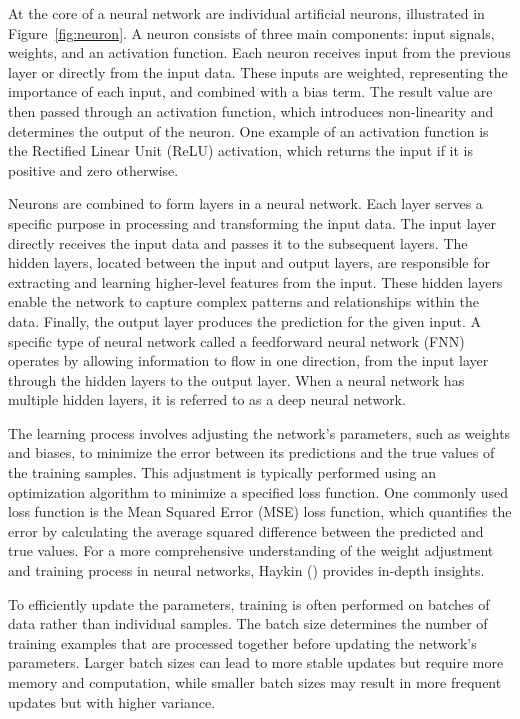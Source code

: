 At the core of a neural network are individual artificial neurons, illustrated in Figure~\ref{fig:neuron}. A neuron consists of three main components: input signals, weights, and an activation function. Each neuron receives input from the previous layer or directly from the input data. These inputs are weighted, representing the importance of each input, and combined with a bias term. The result value are then passed through an activation function, which introduces non-linearity and determines the output of the neuron. One example of an activation function is the Rectified Linear Unit (ReLU) activation, which returns the input if it is positive and zero otherwise.

Neurons are combined to form layers in a neural network. Each layer serves a specific purpose in processing and transforming the input data. The input layer directly receives the input data and passes it to the subsequent layers. The hidden layers, located between the input and output layers, are responsible for extracting and learning higher-level features from the input. These hidden layers enable the network to capture complex patterns and relationships within the data. Finally, the output layer produces the prediction for the given input. A specific type of neural network called a feedforward neural network (FNN) operates by allowing information to flow in one direction, from the input layer through the hidden layers to the output layer. When a neural network has multiple hidden layers, it is referred to as a deep neural network.

The learning process involves adjusting the network's parameters, such as weights and biases, to minimize the error between its predictions and the true values of the training samples. This adjustment is typically performed using an optimization algorithm to minimize a specified loss function. One commonly used loss function is the Mean Squared Error (MSE) loss function, which quantifies the error by calculating the average squared difference between the predicted and true values. For a more comprehensive understanding of the weight adjustment and training process in neural networks, Haykin (\citeyear{Haykin/2009}) provides in-depth insights.

To efficiently update the parameters, training is often performed on batches of data rather than individual samples. The batch size determines the number of training examples that are processed together before updating the network's parameters. Larger batch sizes can lead to more stable updates but require more memory and computation, while smaller batch sizes may result in more frequent updates but with higher variance.

